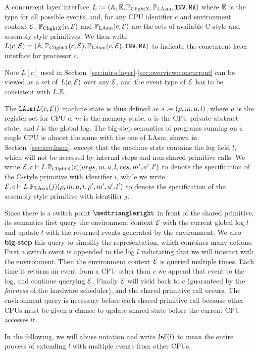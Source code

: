 \begin{definition}
A concurrent layer interface $L :=(\mathbb{A}, \mathbb{E}, \mathbb{P}_{\mathrm{ClightX}}, \mathbb{P}_{\mathrm{LAsm}}, {\texttt{INV}}, {\texttt{MA}})$ where 
$\mathbb{E}$ is the type for all possible events, and, for any CPU identifier $c$ and environment 
context $\mathcal{E}$, $\mathbb{P}_{\mathrm{ClightX}}(c, \mathcal{E})$ 
and $\mathbb{P}_{\mathrm{LAsm}}(c, \mathcal{E})$ are the sets of 
available C-style and assembly-style primitives. We then write $L(c, \mathcal{E}) = (\mathbb{A}, \mathbb{P}_{\mathrm{ClightX}}(c, \mathcal{E}), \mathbb{P}_{\mathrm{LAsm}}(c, \mathcal{E}), {\texttt{INV}}, {\texttt{MA}})$ to indicate the 
concurrent layer interface for processor $c$.
\end{definition}%
\noindent
Note $L[c]$ used in Section~\ref{sec:intro:layer}-\ref{sec:overview:concurrent}
can be viewed as a set of $L(c,\mathcal{E})$ over any $\mathcal{E}$,
and the event type of $\mathcal{E}$ has to be consistent
with $L.\mathbb{E}$.

The ${\texttt{LAsm}}(L(c, \mathcal{E}))$ machine state is thus defined as $s:=(\rho, m, a, l)$,
where $\rho$ is the register set for CPU $c$,
$m$ is the memory state,
$a$ is the CPU-private abstract state,
and $l$ is the global log.
The big-step semantics of programs running on a single CPU is
almost the same with the one of LAsm,
shown in Section~\ref{sec:seq:lasm},
except that the machine state contains the log field $l$,
which will not be accessed by internal steps
and non-shared primitive calls.
We write $\mathcal{E}, c \vdash L.\mathbb{P}_{\mathrm{ClightX}}(i) (args,m, a, l,res,m',a',l')$ to denote
the specification of the C-style primitive
with identifier $i$,
while we write $\mathcal{E}, c \vdash L.\mathbb{P}_{\mathrm{LAsm}}(j) (\rho,m, a, l,\rho',m',a',l')$ to denote
the specification of the assembly-style primitive with identifier $j$.

Since there is a switch point $\intp$ 
in front of the shared primitive,
its semantics first query the environment context $\mathcal{E}$
with the current global log $l$
and update $l$ with the returned events generated by the environment.
We also \textbf{big-step} this query to simplify the representation,
which combines many actions.
First a switch event is
appended to the log $l$ indictating that we will interact with the
environment. Then the environment context $\mathcal{E}$ is queried
multiple times. Each time it returns an event from a CPU other than
$c$ we append that event to the log, and continue querying
$\mathcal{E}$. Finally $\mathcal{E}$ will yield back to $c$
(guaranteed by the \emph{fairness} of the hardware scheduler), and
the shared primitive call occurs.
The environment query is necessary before each shared primitive call because 
other CPUs must be given a chance to update shared state before the current 
CPU accesses it. 
 In the following, we will abuse notation and write
$l \cons \oracle(l)$ to mean the entire process of extending $l$ with
multiple events from other CPUs.

